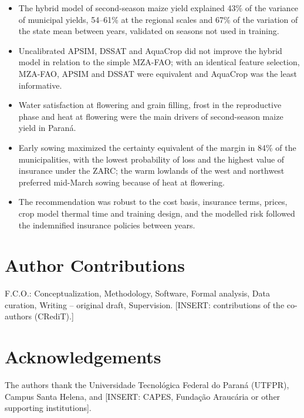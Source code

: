 \documentclass[10pt,a4paper]{article}
\begin{document}
\begin{itemize}[leftmargin=*, itemsep=2pt]
\item The hybrid model of second-season maize yield explained 43\% of the variance of municipal yields,
54--61\% at the regional scales and 67\% of the variation of the state mean between years, validated on
seasons not used in training.
\item Uncalibrated APSIM, DSSAT and AquaCrop did not improve the hybrid model in relation to the simple
MZA-FAO; with an identical feature selection, MZA-FAO, APSIM and DSSAT were equivalent and AquaCrop was the
least informative.
\item Water satisfaction at flowering and grain filling, frost in the reproductive phase and heat at
flowering were the main drivers of second-season maize yield in Paraná.
\item Early sowing maximized the certainty equivalent of the margin in 84\% of the municipalities, with
the lowest probability of loss and the highest value of insurance under the ZARC; the warm lowlands of the
west and northwest preferred mid-March sowing because of heat at flowering.
\item The recommendation was robust to the cost basis, insurance terms, prices, crop model thermal time and
training design, and the modelled risk followed the indemnified insurance policies between years.
\end{itemize}

\section*{Author Contributions}

F.C.O.: Conceptualization, Methodology, Software, Formal analysis, Data curation, Writing -- original draft,
Supervision. [INSERT: contributions of the co-authors (CRediT).]


\section*{Acknowledgements}

The authors thank the Universidade Tecnológica Federal do Paraná (UTFPR), Campus Santa Helena, and
[INSERT: CAPES, Fundação Araucária or other supporting institutions].
\end{document}
